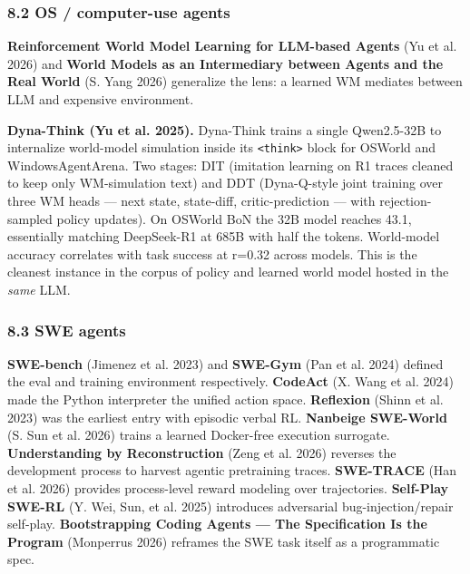 \documentclass{article}
\begin{document}
\hypertarget{os-computer-use-agents}{%
\subsubsection{8.2 OS / computer-use
agents}\label{os-computer-use-agents}}

\textbf{Reinforcement World Model Learning for LLM-based Agents} (Yu et
al. 2026) and \textbf{World Models as an Intermediary between Agents and
the Real World} (S. Yang 2026) generalize the lens: a learned WM
mediates between LLM and expensive environment.

\textbf{Dyna-Think (Yu et al. 2025).} Dyna-Think trains a single
Qwen2.5-32B to internalize world-model simulation inside its
\texttt{\textless{}think\textgreater{}} block for OSWorld and
WindowsAgentArena. Two stages: DIT (imitation learning on R1 traces
cleaned to keep only WM-simulation text) and DDT (Dyna-Q-style joint
training over three WM heads --- next state, state-diff,
critic-prediction --- with rejection-sampled policy updates). On OSWorld
BoN the 32B model reaches 43.1, essentially matching DeepSeek-R1 at 685B
with half the tokens. World-model accuracy correlates with task success
at r=0.32 across models. This is the cleanest instance in the corpus of
policy and learned world model hosted in the \emph{same} LLM.

\hypertarget{swe-agents}{%
\subsubsection{8.3 SWE agents}\label{swe-agents}}

\textbf{SWE-bench} (Jimenez et al. 2023) and \textbf{SWE-Gym} (Pan et
al. 2024) defined the eval and training environment respectively.
\textbf{CodeAct} (X. Wang et al. 2024) made the Python interpreter the
unified action space. \textbf{Reflexion} (Shinn et al. 2023) was the
earliest entry with episodic verbal RL. \textbf{Nanbeige SWE-World} (S.
Sun et al. 2026) trains a learned Docker-free execution surrogate.
\textbf{Understanding by Reconstruction} (Zeng et al. 2026) reverses the
development process to harvest agentic pretraining traces.
\textbf{SWE-TRACE} (Han et al. 2026) provides process-level reward
modeling over trajectories. \textbf{Self-Play SWE-RL} (Y. Wei, Sun, et
al. 2025) introduces adversarial bug-injection/repair self-play.
\textbf{Bootstrapping Coding Agents --- The Specification Is the
Program} (Monperrus 2026) reframes the SWE task itself as a programmatic
spec.
\end{document}
